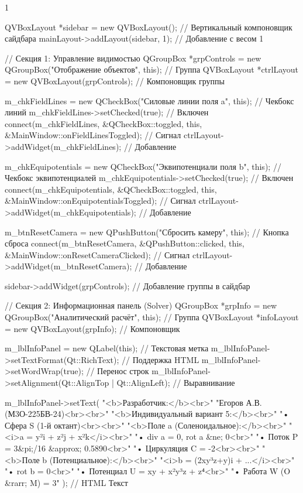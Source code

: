 \begin{listing}{1}
{  QVBoxLayout *sidebar = new QVBoxLayout(); // Вертикальный компоновщик сайдбара
  mainLayout->addLayout(sidebar, 1); // Добавление с весом 1

  // Секция 1: Управление видимостью
  QGroupBox *grpControls = new QGroupBox("Отображение объектов", this); // Группа
  QVBoxLayout *ctrlLayout = new QVBoxLayout(grpControls); // Компоновщик группы

  m_chkFieldLines = new QCheckBox("Силовые линии поля a", this); // Чекбокс линий
  m_chkFieldLines->setChecked(true); // Включен
  connect(m_chkFieldLines, &QCheckBox::toggled, this, &MainWindow::onFieldLinesToggled); // Сигнал
  ctrlLayout->addWidget(m_chkFieldLines); // Добавление

  m_chkEquipotentials = new QCheckBox("Эквипотенциали поля b", this); // Чекбокс эквипотенциалей
  m_chkEquipotentials->setChecked(true); // Включен
  connect(m_chkEquipotentials, &QCheckBox::toggled, this, &MainWindow::onEquipotentialsToggled); // Сигнал
  ctrlLayout->addWidget(m_chkEquipotentials); // Добавление

  m_btnResetCamera = new QPushButton("Сбросить камеру", this); // Кнопка сброса
  connect(m_btnResetCamera, &QPushButton::clicked, this, &MainWindow::onResetCameraClicked); // Сигнал
  ctrlLayout->addWidget(m_btnResetCamera); // Добавление

  sidebar->addWidget(grpControls); // Добавление группы в сайдбар

  // Секция 2: Информационная панель (Solver)
  QGroupBox *grpInfo = new QGroupBox("Аналитический расчёт", this); // Группа
  QVBoxLayout *infoLayout = new QVBoxLayout(grpInfo); // Компоновщик

  m_lblInfoPanel = new QLabel(this); // Текстовая метка
  m_lblInfoPanel->setTextFormat(Qt::RichText); // Поддержка HTML
  m_lblInfoPanel->setWordWrap(true); // Перенос строк
  m_lblInfoPanel->setAlignment(Qt::AlignTop | Qt::AlignLeft); // Выравнивание

  m_lblInfoPanel->setText(
    "<b>Разработчик:</b><br>"
    "Егоров А.В. (М3О-225БВ-24)<br><br>"
    "<b>Индивидуальный вариант 5:</b><br>"
    "• Сфера S (1-й октант)<br><br>"
    "<b>Поле a (Соленоидальное):</b><br>"
    "<i>a = y²i + z²j + x²k</i><br>"
    "• div a = 0, rot a &ne; 0<br>"
    "• Поток P = 3&pi;/16 &approx; 0.5890<br>"
    "• Циркуляция C = -2<br><br>"
    "<b>Поле b (Потенциальное):</b><br>"
    "<i>b = (2xy³z+y)i + ...</i><br>"
    "• rot b = 0<br>"
    "• Потенциал U = xy + x²y³z + z⁴<br>"
    "• Работа W (O &rarr; M) = 3"
  ); // HTML Текст

}
\end{listing}
